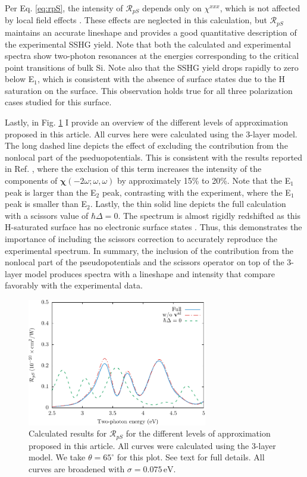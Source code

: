 Per Eq. \eqref{eq:rpS}, the intensity of $\mathcal{R}_{pS}$ depends only on
$\chi^{xxx}$, which is not affected by local field effects
\cite{tancognedejean:tel-01235611}. These effects are neglected in this
calculation, but $\mathcal{R}_{pS}$ maintains an accurate lineshape and provides
a good quantitative description of the experimental SSHG yield. Note that both
the calculated and experimental spectra show two-photon resonances at the
energies corresponding to the critical point transitions of bulk Si. Note also
that the SSHG yield drops rapidly to zero below E$_{1}$, which is consistent
with the absence of surface states due to the H saturation on the surface. This
observation holds true for all three polarization cases studied for this
surface.

Lastly, in Fig. \ref{fig:improvements} I provide an overview of the different
levels of approximation proposed in this article. All curves here were
calculated using the 3-layer model. The long dashed line depicts the effect of
excluding the contribution from the nonlocal part of the pseduopotentials. This
is consistent with the results reported in Ref. \cite{andersonPRB15}, where the
exclusion of this term increases the intensity of the components of
$\boldsymbol{\chi}(-2\omega;\omega,\omega)$ by approximately 15\% to 20\%. Note
that the E$_{1}$ peak is larger than the E$_{2}$ peak, contrasting with the
experiment, where the E$_{1}$ peak is smaller than E$_{2}$. Lastly, the thin
solid line depicts the full calculation with a scissors value of $\hbar\Delta =
0$. The spectrum is almost rigidly redshifted as this H-saturated surface has no
electronic surface states \cite{andersonPRB15}. Thus, this demonstrates the
importance of including the scissors correction to accurately reproduce the
experimental spectrum. In summary, the inclusion of the contribution from the
nonlocal part of the pseudopotentials and the scissors operator on top of the
3-layer model produces spectra with a lineshape and intensity that compare
favorably with the experimental data.

\begin{figure}
\centering
\includegraphics[width=0.7\textwidth]{figures/fig-4_4_03}
\caption{Calculated results for $\mathcal{R}_{pS}$ for the different levels of
approximation proposed in this article. All curves were calculated using the
3-layer model. We take $\theta=65^{\circ}$ for this plot. See text for full
details. All curves are broadened with $\sigma=0.075\,\text{eV}$.}
\label{fig:improvements}
\end{figure}


